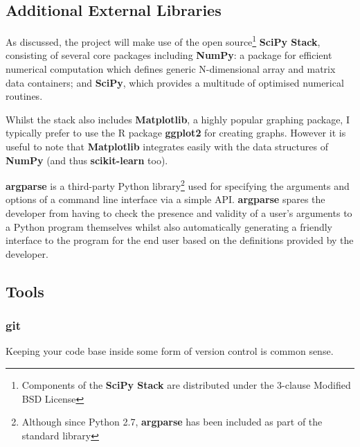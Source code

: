 \subsection{Additional External Libraries}
\label{sec:additional-libs}

As discussed, the project will make use of the open source\footnote{Components
of the \textbf{SciPy Stack} are distributed under the 3-clause Modified BSD
License\citep{scipy-lic}\citep{numpy-lic}} \textbf{SciPy Stack}, consisting of
several core packages including \textbf{NumPy}\citep{NumPySciPy}: a package for
efficient numerical computation which defines generic N-dimensional array and
matrix data containers; and \textbf{SciPy}\citep{SciPy}, which provides a
multitude of optimised numerical routines.

Whilst the stack also includes \textbf{Matplotlib}, a highly popular graphing
package, I typically prefer to use the R package \textbf{ggplot2}\citep{ggplot2}
for creating graphs. However it is useful to note that \textbf{Matplotlib}
integrates easily with the data structures of \textbf{NumPy} (and thus
\textbf{scikit-learn} too).

\textbf{argparse} is a third-party Python library\footnote{Although since Python
2.7, \textbf{argparse} has been included as part of the standard
library\citep{argparse-pypi}} used for specifying the arguments and options of a
command line interface via a simple API.  \textbf{argparse} spares the developer
from having to check the presence and validity of a user's arguments to a Python
program themselves whilst also automatically generating a friendly interface to
the program for the end user based on the definitions provided by the developer.


\subsection{Tools}
\label{part1:dev:tools}

\subsubsection{git}
Keeping your code base inside some form of version control is common sense.



